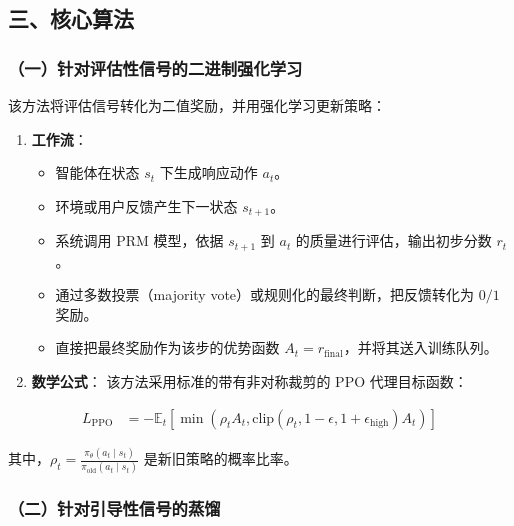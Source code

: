 \hypertarget{ux4e09ux6838ux5fc3ux7b97ux6cd5}{%
\subsection{三、核心算法}\label{ux4e09ux6838ux5fc3ux7b97ux6cd5}}

\hypertarget{ux4e00ux9488ux5bf9ux8bc4ux4f30ux6027ux4fe1ux53f7ux7684ux4e8cux8fdbux5236ux5f3aux5316ux5b66ux4e60}{%
\subsubsection{（一）针对评估性信号的二进制强化学习}\label{ux4e00ux9488ux5bf9ux8bc4ux4f30ux6027ux4fe1ux53f7ux7684ux4e8cux8fdbux5236ux5f3aux5316ux5b66ux4e60}}

该方法将评估信号转化为二值奖励，并用强化学习更新策略：

\begin{enumerate}
\def\labelenumi{\arabic{enumi}.}
\tightlist
\item
  \textbf{工作流}：

  \begin{itemize}
  \tightlist
  \item
    智能体在状态 \(s_t\) 下生成响应动作 \(a_t\)。
  \item
    环境或用户反馈产生下一状态 \(s_{t+1}\)。
  \item
    系统调用 PRM 模型，依据 \(s_{t+1}\) 到 \(a_t\) 的质量进行评估，输出初步分数 \(r_t\)。
  \item
    通过多数投票（majority vote）或规则化的最终判断，把反馈转化为 \(0/1\) 奖励。
  \item
    直接把最终奖励作为该步的优势函数 \(A_t=r_{\mathrm{final}}\)，并将其送入训练队列。
  \end{itemize}
\item
  \textbf{数学公式}：
  该方法采用标准的带有非对称裁剪的 PPO 代理目标函数：
\end{enumerate}

\[
\begin{aligned}
L_{\mathrm{PPO}}
&=
-\mathbb{E}_t
\left[
\min\left(
\rho_t A_t,
\mathrm{clip}(\rho_t,1-\epsilon,1+\epsilon_{\mathrm{high}})A_t
\right)
\right]
\end{aligned}
\]

其中，\(\rho_t=\frac{\pi_\theta(a_t\mid s_t)}{\pi_{\mathrm{old}}(a_t\mid s_t)}\) 是新旧策略的概率比率。

\hypertarget{ux4e8cux9488ux5bf9ux5f15ux5bfcux6027ux4fe1ux53f7ux7684ux84b8ux998f}{%
\subsubsection{（二）针对引导性信号的蒸馏}\label{ux4e8cux9488ux5bf9ux5f15ux5bfcux6027ux4fe1ux53f7ux7684ux84b8ux998f}}

